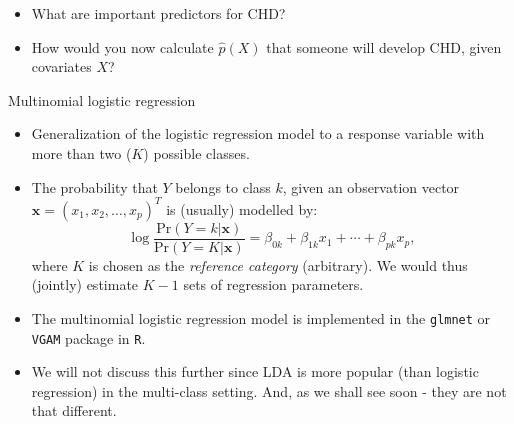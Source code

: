 \documentclass[10pt,ignorenonframetext,]{beamer}
\begin{document}
\begin{frame}

\begin{itemize}
\item
  What are important predictors for CHD?
\item
  How would you now calculate \(\hat{p}(X)\) that someone will develop
  CHD, given covariates \(X\)?
\end{itemize}

\end{frame}

\begin{frame}[fragile]

\begin{block}{Multinomial logistic regression}

\begin{itemize}
\item
  Generalization of the logistic regression model to a response variable
  with more than two (\(K\)) possible classes.
\item
  The probability that \(Y\) belongs to class \(k\), given an
  observation vector \(\mathbf{x} = (x_1, x_2, \dots, x_p)^T\) is
  (usually) modelled by:
  \[\log \frac{\text{Pr}(Y = k | \mathbf{x})}{\text{Pr}(Y = K | \mathbf{x})}= \beta_{0k} + \beta_{1k} x_1 + \cdots + \beta_{pk} x_p ,\]
  where \(K\) is chosen as the \emph{reference category} (arbitrary). We
  would thus (jointly) estimate \(K-1\) sets of regression parameters.
\item
  The multinomial logistic regression model is implemented in the
  \texttt{glmnet} or \texttt{VGAM} package in \texttt{R}.
\item
  We will not discuss this further since LDA is more popular (than
  logistic regression) in the multi-class setting. And, as we shall see
  soon - they are not that different.
\end{itemize}

\end{block}

\end{frame}
\end{document}
